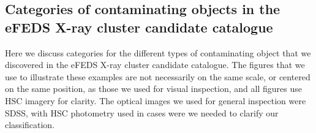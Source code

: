 \documentclass[fleqn,usenatbib]{mnras}
\begin{document}


\subsection{Categories of contaminating objects in the eFEDS X-ray cluster candidate catalogue}
\label{sec:examplerejects}
Here we discuss categories for the different types of contaminating object that we discovered in the eFEDS X-ray cluster candidate catalogue. The figures that we use to illustrate these examples are not necessarily on the same scale, or centered on the same position, as those we used for visual inspection, and all figures use HSC imagery for clarity. The optical images we used for general inspection were SDSS, with HSC photometry used in cases were we needed to clarify our classification.
\end{document}
